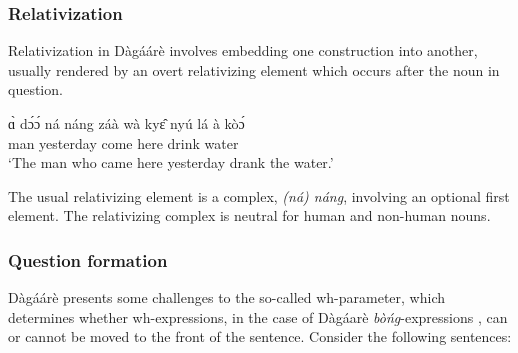 \subsubsection{ Relativization}
Relativization in Dàgáárè involves embedding one construction into another, usually
rendered by an overt relativizing element which occurs after the noun in question.

\ea \gll ɑ̀ dɔ́ɔ́ ná náng záà wà kyɛ̂ nyú lá à kòɔ́\\
{\DEF} man {\REL} {\REL} yesterday come here drink {\FOC} {\DEF} water\\
\glt ‘The man who came here yesterday drank the water.’\z 

The usual relativizing element is a complex, \textit{(ná) náng}, involving an optional first element.
The relativizing complex is neutral for human and non-human nouns.

\subsubsection{Question formation}
Dàgáárè presents some challenges to the so-called wh-parameter, which determines
whether wh-expressions, in the case of Dàgáarè \textit{bòńg}-expressions \citet{Bodomo1997}, can or
cannot be moved to the front of the sentence. Consider the following sentences:


\ea {}
\z\z

\ea {}
\z\z 

\ea {}
\z\z

